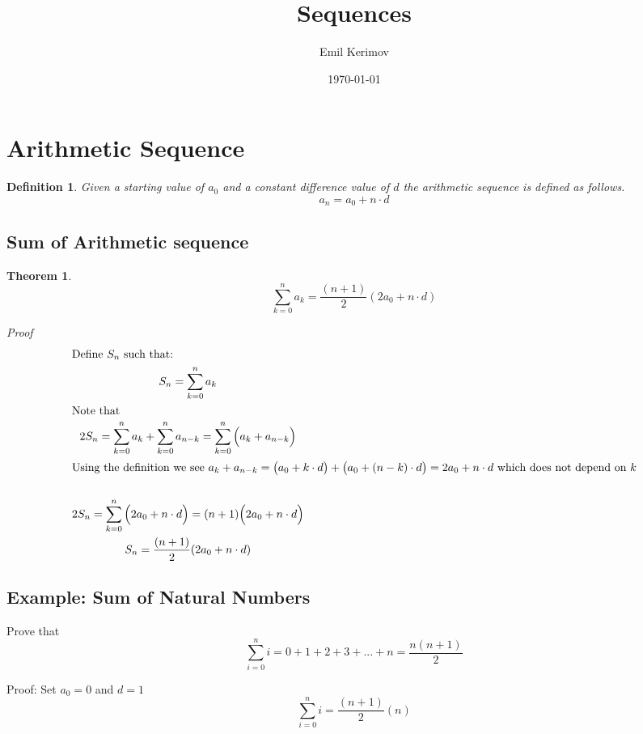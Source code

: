 \documentclass[a4paper]{article}
\title{Sequences}
\author{Emil Kerimov}
\date{\today}
\begin{document}
\maketitle

\newtheorem{theorem}{Theorem}[section]
\newtheorem{definition}{Definition}[section]

\section{Arithmetic Sequence}\label{sec:arithmetic-sequence}

\begin{definition}\label{Arithmetic def}
Given a starting value of $a_0$ and a constant difference value of $d$ the arithmetic sequence is defined as follows.
\[\boxed{
a_n = a_0 + n \cdot d
}
\]
\end{definition}

\subsection{Sum of Arithmetic sequence}\label{subsec:sum-of-arithmetic-sequence}


\begin{theorem}
\begin{equation} \label{eq:sum-of-arithmetic-sequence}
\sum\limits_{k=0}^{n} a_k = \frac{(n+1)}{2} ( 2 a_0 +n \cdot d )
\end{equation}

Proof
\begin{gather*}
\intertext{Define $S_n$ such that:}
S_{n} = \sum_{k=0}^{n} a_k 
\\
\intertext{Note that}
2 S_{n} = \sum_{k=0}^{n} a_k + \sum_{k=0}^{n} a_{n-k} = \sum_{k=0}^{n} \Big( a_k + a_{n-k} \Big)
\\
\intertext{Using the definition we see $a_k + a_{n-k} = \big( a_0 + k \cdot d \big) + \big( a_0 + (n-k) \cdot d \big) =  2 a_0 +n \cdot d $ which does not depend on $k$}
\\
2 S_{n} = \sum_{k=0}^{n} \Big( 2 a_0 +n \cdot d \Big) = (n+1) \Big( 2 a_0 +n \cdot d \Big)
\\
S_{n} = \frac{(n+1)}{2} ( 2 a_0 +n \cdot d )
\end{gather*}
\end{theorem}

\subsection{Example: Sum of Natural Numbers}\label{Sum of Natural Numbers}
Prove that $$\sum\limits_{i=0}^{n} i = 0+ 1+2+3+...+n = \frac{n(n+1)}{2}$$

Proof:
Set $a_0 = 0$ and $d=1$
$$\sum\limits_{i=0}^{n} i
=
\frac{(n+1)}{2} (n )$$
\end{document}
